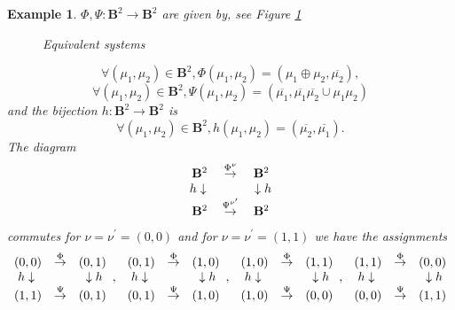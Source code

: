 \documentclass[12pt]{article}\usepackage{amsmath}
\newtheorem{example}[theorem]{Example}
\begin{document}
\begin{example}
$\Phi,\Psi:\mathbf{B}^{2}\rightarrow\mathbf{B}^{2}$ are given by, see Figure
\ref{echiv1}\begin{figure}
[ptb]
\begin{center}
\caption{Equivalent systems}\label{echiv1}\end{center}
\end{figure}
\[
\forall(\mu_{1},\mu_{2})\in\mathbf{B}^{2},\Phi(\mu_{1},\mu_{2})=(\mu_{1}\oplus\mu_{2},\overline{\mu_{2}}),
\]\[
\forall(\mu_{1},\mu_{2})\in\mathbf{B}^{2},\Psi(\mu_{1},\mu_{2})=(\overline
{\mu_{1}},\overline{\mu_{1}}\overline{\mu_{2}}\cup\mu_{1}\mu_{2})
\]
and the bijection $h:\mathbf{B}^{2}\rightarrow\mathbf{B}^{2}$ is\[
\forall(\mu_{1},\mu_{2})\in\mathbf{B}^{2},h(\mu_{1},\mu_{2})=(\overline
{\mu_{2}},\overline{\mu_{1}}).
\]
The diagram\[\begin{array}
[c]{ccc}\mathbf{B}^{2} & \overset{\Phi^{\nu}}{\rightarrow} & \mathbf{B}^{2}\\
h\downarrow\; &  & \;\downarrow h\\
\mathbf{B}^{2} & \overset{\Psi^{\nu^{\prime}}}{\rightarrow} & \mathbf{B}^{2}\end{array}
\]
commutes for $\nu=\nu^{\prime}=(0,0)$ and for $\nu=\nu^{\prime}=(1,1)$ we have
the assignments\[\begin{array}
[c]{ccc}(0,0) & \overset{\Phi}{\rightarrow} & (0,1)\\
h\downarrow\; &  & \;\downarrow h\\
(1,1) & \overset{\Psi}{\rightarrow} & (0,1)
\end{array}
,\;\begin{array}
[c]{ccc}(0,1) & \overset{\Phi}{\rightarrow} & (1,0)\\
h\downarrow\; &  & \;\downarrow h\\
(0,1) & \overset{\Psi}{\rightarrow} & (1,0)
\end{array}
,\;\begin{array}
[c]{ccc}(1,0) & \overset{\Phi}{\rightarrow} & (1,1)\\
h\downarrow\; &  & \;\downarrow h\\
(1,0) & \overset{\Psi}{\rightarrow} & (0,0)
\end{array}
,\;\begin{array}
[c]{ccc}(1,1) & \overset{\Phi}{\rightarrow} & (0,0)\\
h\downarrow\; &  & \;\downarrow h\\
(0,0) & \overset{\Psi}{\rightarrow} & (1,1)

\end{array}\]
\end{example}
\end{document}
